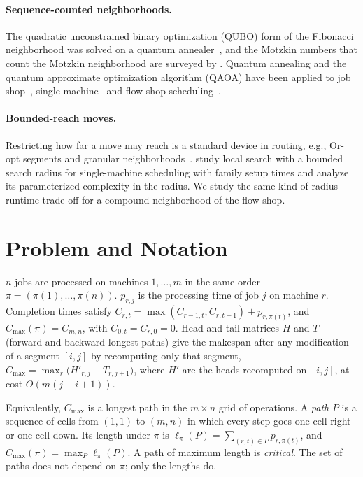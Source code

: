\documentclass[letterpaper]{article} %
\theoremstyle{definition}
\begin{document}
\paragraph{Sequence-counted neighborhoods.} The quadratic unconstrained binary optimization (QUBO) form of the Fibonacci neighborhood was solved on a quantum annealer~\cite{bozejko2026new}, and the Motzkin numbers that count the Motzkin neighborhood are surveyed by \citet{aigner1998}. Quantum annealing and the quantum approximate optimization algorithm (QAOA) have been applied to job shop~\cite{venturelli2015,kurowski2020,kurowski2023}, single-machine~\cite{bozejko2022distributed,bozejko2025noncrossing} and flow shop scheduling~\cite{bozejko2026huge,bozejko2024cinti}.
\paragraph{Bounded-reach moves.} Restricting how far a move may reach is a
standard device in routing, e.g., Or-opt segments and granular
neighborhoods~\cite{toth2003}. \citet{balzereit2024}
study local search with a bounded search radius for single-machine
scheduling with family setup times and analyze its parameterized
complexity in the radius. We study the same kind of radius--runtime
trade-off for a compound neighborhood of the flow shop.

\section{Problem and Notation}\label{sec:problem}

$n$ jobs are processed on machines $1,\dots,m$ in the same order
$\pi=(\pi(1),\dots,\pi(n))$. $p_{r,j}$ is the processing time of job $j$
on machine $r$. Completion times satisfy
$C_{r,t}=\max(C_{r-1,t},C_{r,t-1})+p_{r,\pi(t)}$, and
$C_{\max}(\pi)=C_{m,n}$, with $C_{0,t}=C_{r,0}=0$. Head and tail matrices $H$ and $T$ (forward and
backward longest paths) give the makespan after any modification of a
segment $[i,j]$ by recomputing only that segment,
$C_{\max}=\max_r\bigl(H'_{r,j}+T_{r,j+1}\bigr)$, where $H'$ are the heads recomputed on $[i,j]$, at cost $O(m(j-i+1))$.

Equivalently, $C_{\max}$ is a longest path in the $m\times n$ grid of
operations. A \emph{path} $P$ is a sequence of cells from $(1,1)$ to
$(m,n)$ in which every step goes one cell right or one cell down. Its
length under $\pi$ is $\ell_\pi(P)=\sum_{(r,t)\in P}p_{r,\pi(t)}$, and
$C_{\max}(\pi)=\max_P\ell_\pi(P)$. A path of maximum length is
\emph{critical}. The set of paths does not depend on $\pi$; only the
lengths do.
\end{document}
